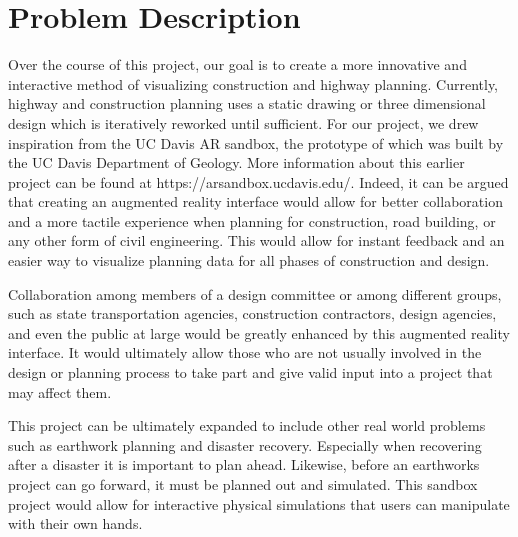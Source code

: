 \documentclass[onecolumn, draftclsnofoot,10pt, compsoc]{IEEEtran}
\begin{document}
\section{Problem Description}
Over the course of this project, our goal is to create a more innovative and interactive method of visualizing construction and highway planning.
Currently, highway and construction planning uses a static drawing or three dimensional design which is iteratively reworked until sufficient.
For our project, we drew inspiration from the UC Davis AR sandbox, the prototype of which was built by the UC Davis Department of Geology. More information about this earlier project can be found at https://arsandbox.ucdavis.edu/.
Indeed, it can be argued that creating an augmented reality interface would allow for better collaboration and a more tactile experience when planning for construction, road building, or any other form of civil engineering.
This would allow for instant feedback and an easier way to visualize planning data for all phases of construction and design.
\par
Collaboration among members of a design committee or among different groups, such as state transportation agencies, construction contractors, design agencies, and even the public at large would be greatly enhanced by this augmented reality interface.
It would ultimately allow those who are not usually involved in the design or planning process to take part and give valid input into a project that may affect them.
\par
This project can be ultimately expanded to include other real world  problems such as earthwork planning and disaster recovery.
Especially when recovering after a disaster it is important to plan ahead. Likewise, before an earthworks project can go forward, it must be planned out and simulated.
This sandbox project would allow for interactive physical simulations that users can manipulate with their own hands.
\end{document}
